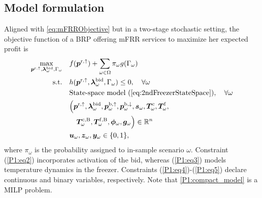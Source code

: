 \subsection{Model formulation}
Aligned with \eqref{eq:mFRRObjective} but in a two-stage stochastic setting, the objective function of a BRP offering mFRR services to maximize her expected profit is
%
\begin{subequations}\label{P1:compact_model}
    \begin{align}
        \underset{\bm{p}^{\rm{r},\uparrow}, \bm{\lambda}_{\omega}^{\text{bid}}, \Gamma_{\omega}}{\textrm{max}} \quad & f(\bm{p}^{\rm{r},\uparrow}) + \sum_{\omega \in \Omega} \pi_{\omega} g(\Gamma_{\omega}) \label{P1:eq1}
        \\
        \text{s.t.} \quad                                                                                            & h(\bm{p}^{\rm{r},\uparrow}, \bm{\lambda}_{\omega}^{\text{bid}}, \Gamma_{\omega}) \leq 0, \quad \forall{\omega}\label{P1:eq2}                                                                                             \\
        \quad                                                                                                        & \text{State-space model } (\ref{eq:2ndFreezerStateSpace}), \quad \forall{\omega} \label{P1:eq3}
        \\
        \quad                                                                                                        & \Bigl( \bm{p}^{\rm{r},\uparrow}, \bm{\lambda}_{\omega}^{\text{bid}}, \bm{p}_{\omega}^{\rm{b},\uparrow}, \bm{p}_{\omega}^{\rm{b},\downarrow}, \bm{s}_{\omega}, \bm{T}_{\omega}^{\rm{c}}, \bm{T}_{\omega}^{\rm{f}}, \notag \\ \quad & \quad \bm{T}_{\omega}^{\rm{c,B}}, \bm{T}_{\omega}^{\rm{f,B}}, \bm{\phi}_{\omega}, \bm{g}_{\omega} \Bigr) \in \mathbb{R}^{n}  \label{P1:eq4}
        \\
        \quad                                                                                                        & \bm{u}_{\omega}, \bm{z}_{\omega}, \bm{y}_{\omega} \in \{0,1\},  \label{P1:eq5}
    \end{align}
\end{subequations}
%
where $\pi_{\omega}$ is the probability assigned to in-sample scenario $\omega$. Constraint (\ref{P1:eq2}) incorporates activation of the bid, whereas (\ref{P1:eq3}) models temperature dynamics in the freezer. Constraints (\ref{P1:eq4})-(\ref{P1:eq5}) declare continuous and binary variables, respectively. Note that \eqref{P1:compact_model} is a MILP problem.


